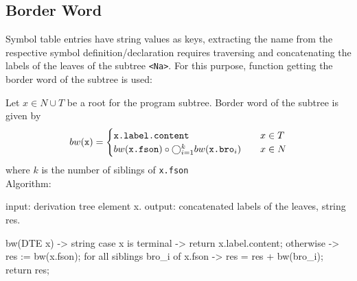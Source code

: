 \subsection{Border Word}\label{subsec:border-word}
Symbol table entries have string values as keys, extracting the name from the respective symbol definition/declaration
requires traversing and concatenating the labels of the leaves of the subtree \verb+<Na>+.
For this purpose, function getting the border word of the subtree is used:
\begin{definition}[bw]
    Let $x \in N \cup T$ be a root for the program subtree.
    Border word of the subtree is given by
    \[
        bw(\verb+x+) = \begin{cases}
                           \verb+x.label.content+&\quad x\in T\\
                           bw(\verb+x.fson+)\circ \bigcirc_{i=1}^k bw(\verb+x.bro+_i)&\quad x\in N
        \end{cases}
    \]
    where $k$ is the number of siblings of \verb+x.fson+\\
    Algorithm:
\end{definition}
\begin{codeblock}
    input: derivation tree element x.
    output: concatenated labels of the leaves, string res.

    bw(DTE x) -> string {
        case x is terminal -> return x.label.content;
        otherwise -> {
            res := bw(x.fson);
            for all siblings bro_i of x.fson -> {
                res = res + bw(bro_i);
            }
            return res;
        }
    }
\end{codeblock}

